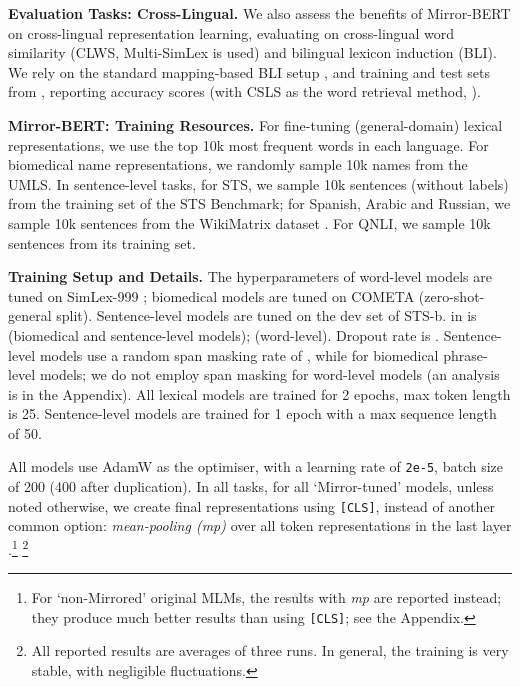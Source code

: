 \documentclass[11pt]{article}
\begin{document}
\vspace{1.5mm}
\noindent \textbf{Evaluation Tasks: Cross-Lingual.} We also assess the benefits of Mirror-BERT on cross-lingual representation learning, evaluating on cross-lingual word similarity (CLWS, Multi-SimLex is used) and bilingual lexicon induction (BLI). We rely on the standard mapping-based BLI setup \cite{artetxe-etal-2018-robust}, and training and test sets from \citet{glavas-etal-2019-properly}, reporting accuracy  scores (with CSLS as the word retrieval method, \citealt{lample2018word}).

\vspace{1.5mm}
\noindent \textbf{Mirror-BERT: Training Resources.} For fine-tuning (general-domain) lexical representations, we use the top 10k most frequent words in each language. For biomedical name representations, we randomly sample 10k names from the UMLS. In sentence-level tasks, for STS, we sample 10k sentences (without labels) from the training set of the STS Benchmark; for Spanish, Arabic and Russian, we sample 10k sentences from the WikiMatrix dataset \citep{schwenk2019wikimatrix}. For QNLI, we sample 10k sentences from its training set. 





\vspace{1.5mm}
\noindent \textbf{Training Setup and Details.} 
The hyperparameters of word-level models are tuned on SimLex-999 \citep{hill2015simlex}; biomedical models are tuned on COMETA (zero-shot-general split). Sentence-level models are tuned on the dev set of STS-b.  in  is  (biomedical and sentence-level models);  (word-level). Dropout rate  is . Sentence-level models use a random span masking rate of , while  for biomedical phrase-level models; we do not employ span masking for word-level models (an analysis is in the Appendix). All lexical models are trained for 2 epochs, max token length is 25. Sentence-level models are trained for 1 epoch with a max sequence length of 50. 

All models use AdamW \citep{loshchilov2018decoupled} as the optimiser, with a learning rate of \texttt{2e-5}, batch size of 200 (400 after duplication). In all tasks, for all `Mirror-tuned' models, unless noted otherwise, we create final representations using \texttt{[CLS]}, instead of another common option: \textit{mean-pooling (mp)} over all token representations in the last layer \cite{reimers2019sentence}.\footnote{For `non-Mirrored' original MLMs, the results with \textit{mp} are reported instead; they produce much better results than using \texttt{[CLS]}; see the Appendix.} \footnote{All reported results are averages of three runs. In general, the training is very stable, with negligible fluctuations.}
\end{document}
